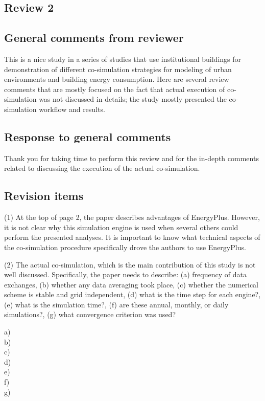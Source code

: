 \documentclass[answers,12pt]{exam}
\begin{document}
\begin{questions}
\pagebreak
\section{Review 2}

\subsection{General comments from reviewer}
This is a nice study in a series of studies that use institutional buildings for demonstration of different co-simulation strategies for modeling of urban environments and building energy consumption. Here are several review comments that are mostly focused on the fact that actual execution of co-simulation was not discussed in details; the study mostly presented the co-simulation workflow and results. 


\subsection{Response to general comments}
\begin{solution}
Thank you for taking time to perform this review and for the in-depth comments related to discussing the execution of the actual co-simulation.
\end{solution}

\subsection{Revision items}

\question 
(1) At the top of page 2, the paper describes advantages of EnergyPlus. However, it is not clear why this simulation engine is used when several others could perform the presented analyses. It is important to know what technical aspects of the co-simulation procedure specifically drove the authors to use EnergyPlus. 
\begin{solution}

\end{solution}

\question 
(2) The actual co-simulation, which is the main contribution of this study is not well discussed. Specifically, the paper needs to describe: (a) frequency of data exchanges, (b) whether any data averaging took place, (c) whether the numerical scheme is stable and grid independent, (d) what is the time step for each engine?, (e) what is the simulation time?, (f) are these annual, monthly, or daily simulations?, (g) what convergence criterion was used? 
\begin{solution}
a) \\
b) \\
c) \\
d) \\
e) \\
f) \\
g) \\
\end{solution}


\end{questions}
\end{document}
